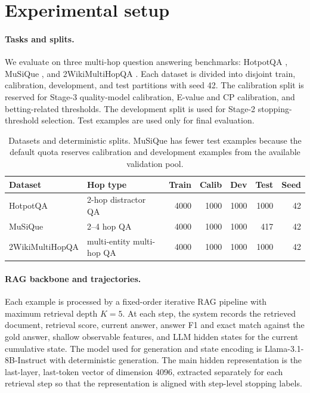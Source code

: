 \documentclass{article}
\newcommand{\hotpot}{HotpotQA}
\newcommand{\musique}{MuSiQue}
\newcommand{\twowiki}{2WikiMultiHopQA}
\begin{document}
\section{Experimental setup}
\label{sec:setup}

\paragraph{Tasks and splits.}
We evaluate on three multi-hop question answering benchmarks: \hotpot{} \citep{yangHotpotQADatasetDiverse2018}, \musique{} \citep{trivediMuSiQueMultihopQuestions2022}, and \twowiki{} \citep{hoConstructingMultihopQADataset2020}. Each dataset is divided into disjoint train, calibration, development, and test partitions with seed 42. The calibration split is reserved for Stage-3 quality-model calibration, E-value and CP calibration, and betting-related thresholds. The development split is used for Stage-2 stopping-threshold selection. Test examples are used only for final evaluation.

\begin{table}[t]
  \caption{Datasets and deterministic splits. \musique{} has fewer test examples because the default quota reserves calibration and development examples from the available validation pool.}
  \label{tab:splits}
  \centering
  \small
  \begin{tabular}{llrrrrr}
    \toprule
    Dataset & Hop type & Train & Calib & Dev & Test & Seed \\
    \midrule
    \hotpot{} & 2-hop distractor QA & 4000 & 1000 & 1000 & 1000 & 42 \\
    \musique{} & 2--4 hop QA & 4000 & 1000 & 1000 & 417 & 42 \\
    \twowiki{} & multi-entity multi-hop QA & 4000 & 1000 & 1000 & 1000 & 42 \\
    \bottomrule
  \end{tabular}
\end{table}

\paragraph{RAG backbone and trajectories.}
Each example is processed by a fixed-order iterative RAG pipeline with maximum retrieval depth $K=5$. At each step, the system records the retrieved document, retrieval score, current answer, answer F1 and exact match against the gold answer, shallow observable features, and LLM hidden states for the current cumulative state. The model used for generation and state encoding is Llama-3.1-8B-Instruct with deterministic generation. The main hidden representation is the last-layer, last-token vector of dimension 4096, extracted separately for each retrieval step so that the representation is aligned with step-level stopping labels.
\end{document}
